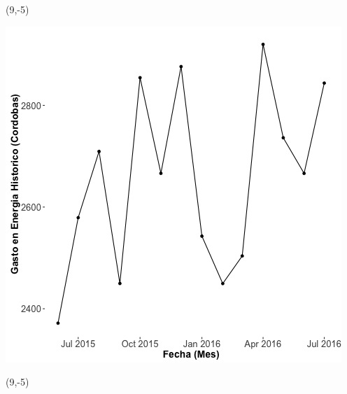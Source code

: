 \documentclass{article}\usepackage[]{graphicx}\usepackage[]{color}
\newenvironment{knitrout}{}{} %
\begin{document}
 \begin{textblock}{1}(9,-5)
\begin{minipage}{20em}
\begingroup

\endgroup
\end{minipage}
\end{textblock}

\begin{knitrout}
\color{fgcolor}
\includegraphics[scale=0.65]{figure/A16_historico_cordobas} 
\end{knitrout}

 \begin{textblock}{1}(9,-5)
\begin{minipage}{20em}
\begingroup

\endgroup
\end{minipage}
\end{textblock}
\end{document}
